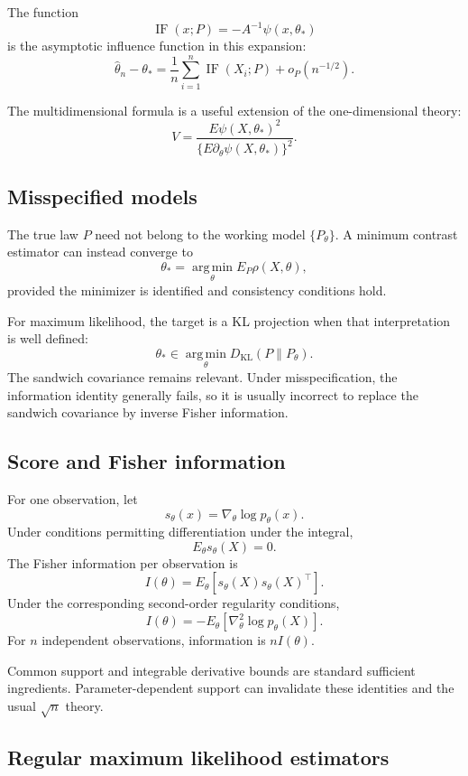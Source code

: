 The function
\[
\operatorname{IF}(x;P)
=
-A^{-1}\psi(x,\theta_*)
\]
is the asymptotic influence function in this expansion:
\[
\widehat\theta_n-\theta_*
=
\frac1n\sum_{i=1}^n\operatorname{IF}(X_i;P)
+o_P(n^{-1/2}).
\]

The multidimensional formula is a useful extension of the
one-dimensional theory:
\[
V=
\frac{E\psi(X,\theta_*)^2}
{\{E\partial_\theta\psi(X,\theta_*)\}^2}.
\]

\subsection{Misspecified models}

The true law $P$ need not belong to the working model
$\{P_\theta\}$. A minimum contrast estimator can instead converge to
\[
\theta_*=\operatorname*{arg\,min}_\theta
E_P\rho(X,\theta),
\]
provided the minimizer is identified and consistency conditions
hold.

For maximum likelihood, the target is a KL projection when that
interpretation is well defined:
\[
\theta_*\in
\operatorname*{arg\,min}_\theta D_{\mathrm{KL}}(P\|P_\theta).
\]
The sandwich covariance remains relevant. Under misspecification,
the information identity generally fails, so it is usually
incorrect to replace the sandwich covariance by inverse Fisher
information.

\subsection{Score and Fisher information}

For one observation, let
\[
s_\theta(x)=\nabla_\theta\log p_\theta(x).
\]
Under conditions permitting differentiation under the integral,
\[
E_\theta s_\theta(X)=0.
\]
The Fisher information per observation is
\[
I(\theta)
=
E_\theta[s_\theta(X)s_\theta(X)^\top].
\]
Under the corresponding second-order regularity conditions,
\[
I(\theta)
=
-E_\theta[\nabla_\theta^2\log p_\theta(X)].
\]
For $n$ independent observations, information is $nI(\theta)$.

Common support and integrable derivative bounds are standard
sufficient ingredients. Parameter-dependent support can invalidate
these identities and the usual $\sqrt n$ theory.

\subsection{Regular maximum likelihood estimators}

